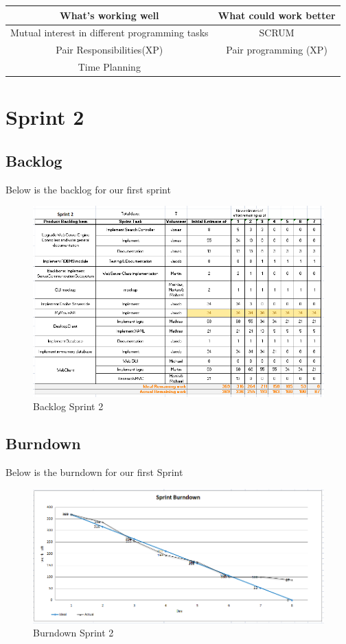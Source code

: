 \begin{center}
\begin{tabular}{|c|c|}
\hline \textbf{What's working well} & \textbf{What could work better} \\ 
\hline Mutual interest in different programming tasks & SCRUM \\ 
Pair Responsibilities(XP) & Pair programming (XP) \\ 
 Time Planning &  \\ 
\hline 
\end{tabular} 
\end{center}



\newpage
\section{Sprint 2}
\label{chap:Spring 2}

\subsection{Backlog}
Below is the backlog for our first sprint
\begin{figure}[h]
\includegraphics[scale=0.6]{img/SCRUM/backlogSprint2.png}
\caption{Backlog Sprint 2}
\label{fig:Backlog Sprint 2}
\end{figure}

\newpage
\subsection{Burndown}
Below is the burndown for our first Sprint
\begin{figure}[h]
\includegraphics[scale=0.55]{img/SCRUM/burndownSprint2.png}
\caption{Burndown Sprint 2}
\label{fig:Burndown Sprint 2}
\end{figure}


